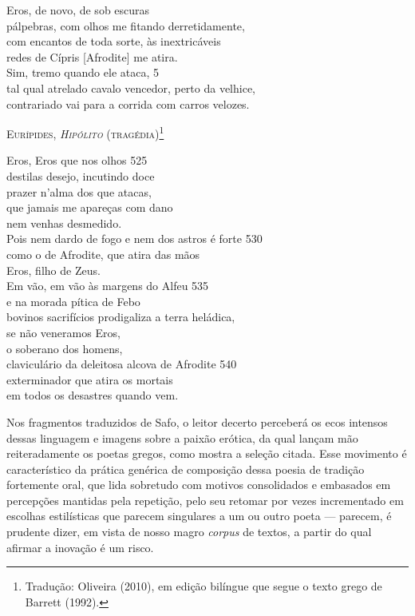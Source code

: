 \begin{hedraquote}
\smallskip

Eros, de novo, de sob escuras\\
pálpebras, com olhos me fitando derretidamente,\\ %
com encantos de toda sorte, às inextricáveis\\
redes de Cípris \textup{[Afrodite]} me atira.\\ %
Sim, tremo quando ele ataca, \num{5}\\
tal qual atrelado cavalo vencedor, perto da velhice,\\
contrariado vai para a corrida com carros velozes.

\pagebreak

{\centering
\textsc{Eurípides, \textit{Hipólito} (tragédia)}\footnote{ Tradução: Oliveira (2010), em
edição bilíngue que segue o texto grego de Barrett (1992).}
\par}

\smallskip

Eros, Eros que nos olhos \num{525}\\
destilas desejo, incutindo doce\\ 
prazer n’alma dos que atacas,\\
que jamais me apareças com dano\\
nem venhas desmedido.\\
Pois nem dardo de fogo e nem dos astros é forte \num{530}\\
como o de Afrodite, que atira das mãos\\
Eros, filho de Zeus.\\
Em vão, em vão às margens do Alfeu \num{535}\\
e na morada pítica de Febo\\
bovinos sacrifícios prodigaliza a terra heládica,\\
se não veneramos Eros,\\
o soberano dos homens,\\
claviculário da deleitosa alcova de Afrodite \num{540}\\
exterminador que atira os mortais\\
em todos os desastres quando vem.
\end{hedraquote}

Nos fragmentos traduzidos de Safo, o leitor decerto perceberá os ecos intensos
dessas linguagem e imagens sobre a paixão erótica, da qual lançam mão
reiteradamente os poetas gregos, como mostra a seleção citada. Esse movimento é
característico da prática genérica de composição dessa poesia de tradição
fortemente oral, que lida sobretudo com motivos consolidados e embasados em
percepções mantidas pela repetição, pelo seu retomar por vezes incrementado em
escolhas estilísticas que parecem singulares a um ou outro poeta --- parecem, é
prudente dizer, em vista de nosso magro \textit{corpus} de textos, a partir do
qual afirmar a inovação é um risco.

